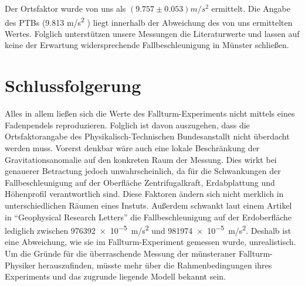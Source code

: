 \documentclass[
	a4paper,
	12pt,
	pagesize,
	ngerman
]{scrartcl}
\begin{document}
	
	Der Ortsfaktor wurde von uns als $(9.757 \pm 0.053) \si{m/s^2}$ ermittelt. Die Angabe des PTBs (9.813 \si{m/s^2} ) liegt innerhalb der Abweichung des von uns ermittelten Wertes. Folglich unterstützen unsere Messungen die Literaturwerte und lassen auf keine der Erwartung widersprechende Fallbeschleunigung in Münster schließen.

	\section{Schlussfolgerung}
	Alles in allem ließen sich die Werte des Fallturm-Experiments nicht mittels eines Fadenpendels reproduzieren. Folglich ist davon auszugehen, dass die Ortsfaktorangabe des Physikalisch-Technischen Bundesanstallt nicht überdacht werden muss. Vorerst denkbar wäre auch eine lokale Beschränkung der Gravitationsanomalie auf den konkreten Raum der Messung. Dies wirkt bei genauerer Betractung jedoch unwahrscheinlich, da für die Schwankungen der Fallbeschleunigung auf der Oberfläche Zentrifugalkraft, Erdabplattung und Höhenprofil verantwortlich sind. Diese Faktoren ändern sich nicht merklich in unterschiedlichen Räumen eines Instuts. Außerdem schwankt laut einem Artikel in \enquote{Geophysical Research Letters} \cite{Fall} die Fallbeschleunigung auf der Erdoberfläche lediglich zwischen \SI{976392e-5}{m/s^2} und \SI{981974e-5}{m/s^2}. %
	 Deshalb ist eine Abweichung, wie sie im Fallturm-Experiment gemessen wurde, unrealistisch.  Um die Gründe für die überraschende Messung der münsteraner Fallturm-Physiker herauszufinden, müsste mehr über die Rahmenbedingungen ihres Experiments und das zugrunde liegende Modell bekannt sein.



\end{document}
